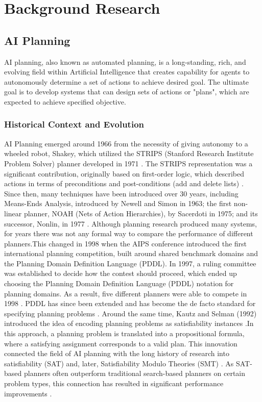 \documentclass[12pt, a4paper, oneside]{report} %
\begin{document}
\chapter{Background Research}
\label{chap:background}

\section{AI Planning}
AI planning, also known as automated planning, is a long-standing, rich, and evolving field within Artificial Intelligence that creates capability for agents to autonomously determine a set of actions to achieve desired goal. The ultimate goal is to develop systems that can design sets of actions or "plans", which are expected to achieve specified objective.
\subsection{Historical Context and Evolution}
AI Planning emerged around 1966 from the necessity of giving autonomy to a wheeled robot, Shakey, which utilized the STRIPS (Stanford Research Institute Problem Solver) planner developed in 1971 \cite{Aiello2024}. The STRIPS representation was a significant contribution, originally based on first-order logic, which described actions in terms of preconditions and post-conditions (add and delete lists) \cite{Aiello2024}. Since then, many techniques have been introduced over 30 years, including Means-Ends Analysis, introduced by Newell and Simon in 1963; the first non-linear planner, NOAH (Nets of Action Hierarchies), by Sacerdoti in 1975; and its successor, Nonlin, in 1977 \cite{Hendler1990}. Although planning research produced many systems, for years there was not any formal way to compare the performance of different planners.This changed in 1998 when the AIPS conference introduced the first international planning competition, built around shared benchmark domains and the Planning Domain Definition Language (PDDL). In 1997, a ruling committee was established to decide how the contest should proceed, which ended up choosing the Planning Domain Definition Language (PDDL) notation for planning domains. As a result, five different planners were able to compete in 1998 \cite{McDermott2000}. PDDL has since been extended and has become the de facto standard for specifying planning problems \cite{Aiello2024}.
Around the same time, Kautz and Selman (1992) introduced the idea of encoding planning problems as satisfiability instances \cite{Nareyek2005}.In this approach, a planning problem is translated into a propositional formula, where a satisfying assignment corresponds to a valid plan. This innovation connected the field of AI planning with the long history of research into satisfiability (SAT) and, later, Satisfiability Modulo Theories (SMT) \cite{Franco2009_History}. As SAT-based planners often outperform traditional search-based planners on certain problem types, this connection has resulted in significant performance improvements \cite{Weld1999}.
\end{document}
